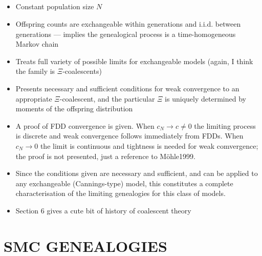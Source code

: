 \documentclass{article}
\begin{document}
\subsection*{\cite{mohle2001}}
\begin{itemize}
\item Constant population size $N$
\item Offspring counts are exchangeable within generations and i.i.d. between generations --- implies the genealogical process is a time-homogeneous Markov chain
\item Treats full variety of possible limits for exchangeable models (again, I think the family is $\Xi$-coalescents)
\item Presents necessary and sufficient conditions for weak convergence to an appropriate $\Xi$-coalescent, and the particular $\Xi$ is uniquely determined by moments of the offspring distribution
\item A proof of FDD convergence is given. When $c_N\to c\neq0$ the limiting process is discrete and weak convergence follows immediately from FDDs. When $c_N\to0$ the limit is continuous and tightness is needed for weak comvergence; the proof is not presented, just a reference to M\"ohle1999.
\item Since the conditions given are necessary and sufficient, and can be applied to any exchangeable (Cannings-type) model, this constitutes a complete characterisation of the limiting genealogies for this class of models.
\item Section 6 gives a cute bit of history of coalescent theory
\end{itemize}


\subsection*{\cite{mohle2002coal}}


\subsection*{\cite{mohle2003}}


\subsection*{\cite{schweinsberg2003}}





\section*{SMC GENEALOGIES}
\end{document}
